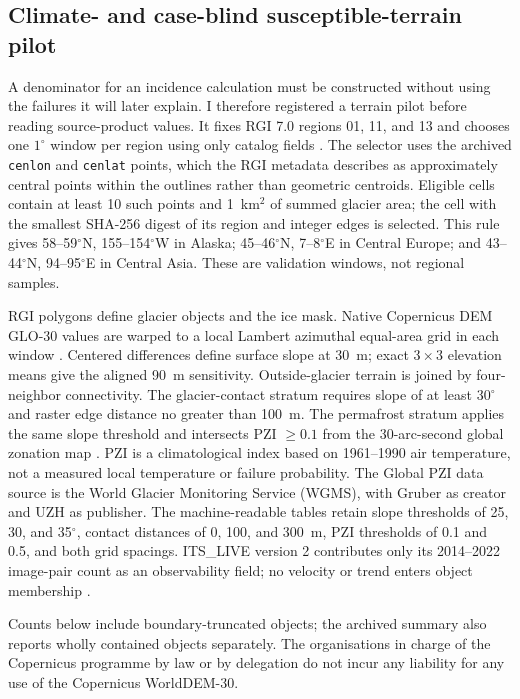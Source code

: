 \documentclass[11pt]{article}
\begin{document}
\subsection{Climate- and case-blind susceptible-terrain pilot}

A denominator for an incidence calculation must be constructed without using
the failures it will later explain. I therefore registered a terrain pilot
before reading source-product values. It fixes RGI 7.0 regions 01, 11, and 13
and chooses one $1^\circ$ window per region using only catalog fields
\citep{RGI7}. The selector uses the archived \texttt{cenlon} and
\texttt{cenlat} points, which the RGI metadata describes as approximately
central points within the outlines rather than geometric centroids. Eligible
cells contain at least 10 such points and 1~km$^2$ of summed glacier area; the
cell with the smallest SHA-256 digest of its region and integer edges is
selected. This rule gives
58--59$^\circ$N, 155--154$^\circ$W in Alaska; 45--46$^\circ$N,
7--8$^\circ$E in Central Europe; and 43--44$^\circ$N, 94--95$^\circ$E in
Central Asia. These are validation windows, not regional samples.

RGI polygons define glacier objects and the ice mask. Native Copernicus DEM
GLO-30 values are warped to a local Lambert azimuthal equal-area grid in each
window \citep{CopernicusDEM2021}. Centered differences define surface slope
at 30~m; exact $3\times3$ elevation means give the aligned 90~m sensitivity.
Outside-glacier terrain is joined by four-neighbor connectivity. The
glacier-contact stratum requires slope of at least 30$^\circ$ and raster edge
distance no greater than 100~m. The permafrost stratum applies the same slope
threshold and intersects PZI $\geq0.1$ from the 30-arc-second global zonation
map \citep{Gruber2012,Gruber2017}. PZI is a climatological index based on 1961--1990 air
temperature, not a measured local temperature or failure probability. The
Global PZI data source is the World Glacier Monitoring Service (WGMS), with
Gruber as creator and UZH as publisher. The machine-readable tables retain
slope thresholds of 25, 30, and 35$^\circ$,
contact distances of 0, 100, and 300~m, PZI thresholds of 0.1 and 0.5, and both
grid spacings. ITS\_LIVE version 2 contributes only its 2014--2022 image-pair
count as an observability field; no velocity or trend enters object membership
\citep{ITSLIVEv2}.

Counts below include boundary-truncated objects; the archived summary also
reports wholly contained objects separately. The organisations in charge of
the Copernicus programme by law or by delegation do not incur any liability
for any use of the Copernicus WorldDEM-30.
\end{document}
